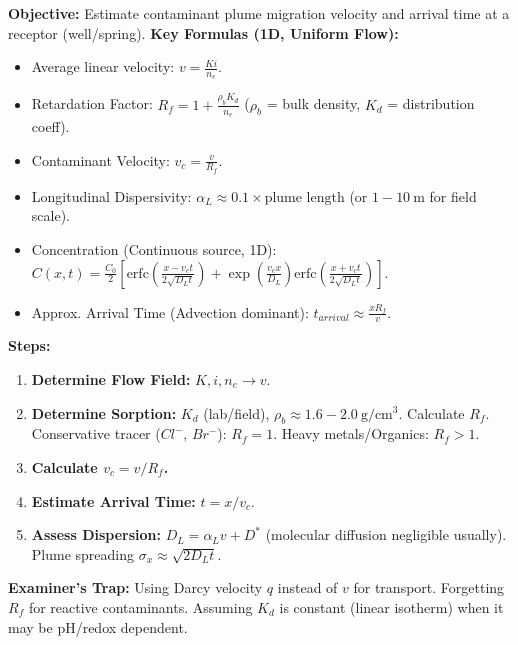 \documentclass[11pt]{article}
\begin{document}
\begin{methode}
\textbf{Objective:} Estimate contaminant plume migration velocity and arrival time at a receptor (well/spring).
\textbf{Key Formulas (1D, Uniform Flow):}
\begin{itemize}
    \item Average linear velocity: $v = \frac{K i}{n_e}$.
    \item Retardation Factor: $R_f = 1 + \frac{\rho_b K_d}{n_e}$ ($\rho_b$ = bulk density, $K_d$ = distribution coeff).
    \item Contaminant Velocity: $v_c = \frac{v}{R_f}$.
    \item Longitudinal Dispersivity: $\alpha_L \approx 0.1 \times \text{plume length}$ (or $1-10\ \mathrm{m}$ for field scale).
    \item Concentration (Continuous source, 1D): $C(x,t) = \frac{C_0}{2} \left[ \text{erfc}\left(\frac{x - v_c t}{2\sqrt{D_L t}}\right) + \exp\left(\frac{v_c x}{D_L}\right) \text{erfc}\left(\frac{x + v_c t}{2\sqrt{D_L t}}\right) \right]$.
    \item Approx. Arrival Time (Advection dominant): $t_{arrival} \approx \frac{x R_f}{v}$.
\end{itemize}
\textbf{Steps:}
\begin{enumerate}
    \item \textbf{Determine Flow Field:} $K, i, n_e \to v$.
    \item \textbf{Determine Sorption:} $K_d$ (lab/field), $\rho_b \approx 1.6-2.0\ \mathrm{g/cm^3}$. Calculate $R_f$. Conservative tracer ($Cl^-$, $Br^-$): $R_f=1$. Heavy metals/Organics: $R_f > 1$.
    \item \textbf{Calculate $v_c = v / R_f$.}
    \item \textbf{Estimate Arrival Time:} $t = x / v_c$.
    \item \textbf{Assess Dispersion:} $D_L = \alpha_L v + D^*$ (molecular diffusion negligible usually). Plume spreading $\sigma_x \approx \sqrt{2 D_L t}$.
\end{enumerate}
\textbf{Examiner's Trap:} Using Darcy velocity $q$ instead of $v$ for transport. Forgetting $R_f$ for reactive contaminants. Assuming $K_d$ is constant (linear isotherm) when it may be pH/redox dependent.
\end{methode}
\end{document}
